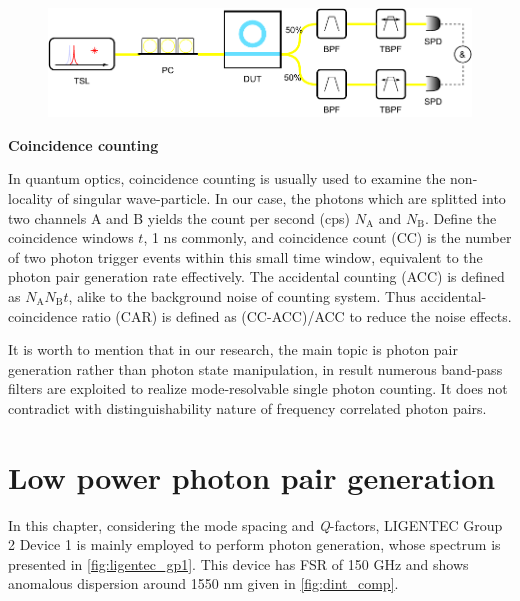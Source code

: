 \begin{figure}
	\centering
	\includegraphics[width=1\linewidth]{imgs/biBPF.pdf}
%	
	\label{fig:bibpf}
\end{figure}

\bigskip
\noindent\textbf{Coincidence counting}

In quantum optics, coincidence counting is usually used to examine the non-locality of singular wave-particle. In our case, the photons which are splitted into two channels A and B yields the count per second (cps) $N_\mathrm{A}$ and $ N_\mathrm{B} $. Define the coincidence windows $t$, 1 ns commonly, and coincidence count (CC) is the number of two photon trigger events within this small time window, equivalent to the photon pair generation rate effectively. The accidental counting (ACC) is defined as $ N_\mathrm{A} N_\mathrm{B} t $, alike to the background noise of counting system. Thus accidental-coincidence ratio (CAR) is defined as (CC-ACC)/ACC to reduce the noise effects.

It is worth to mention that in our research, the main topic is photon pair generation rather than photon state manipulation, in result numerous band-pass filters are exploited to realize mode-resolvable single photon counting. It does not contradict with distinguishability nature of frequency correlated photon pairs.


\section{Low power photon pair generation}
In this chapter, considering the mode spacing and \textit{Q}-factors, LIGENTEC Group 2 Device 1 is mainly employed to perform photon generation, whose spectrum is presented in \autoref{fig:ligentec_gp1}. This device has FSR of 150 GHz and shows anomalous dispersion around 1550 nm given in \autoref{fig:dint_comp}.


